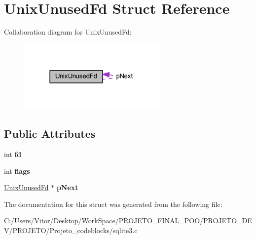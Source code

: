 \hypertarget{struct_unix_unused_fd}{\section{Unix\-Unused\-Fd Struct Reference}
\label{struct_unix_unused_fd}
}


Collaboration diagram for Unix\-Unused\-Fd\-:\nopagebreak
\begin{figure}[H]
\begin{center}
\leavevmode
\includegraphics[width=207pt]{struct_unix_unused_fd__coll__graph}
\end{center}
\end{figure}
\subsection*{Public Attributes}
\begin{DoxyCompactItemize}
\item 
\hypertarget{struct_unix_unused_fd_a3f1a6127218af971aeb7b131c9c1600d}{int {\bfseries fd}}\label{struct_unix_unused_fd_a3f1a6127218af971aeb7b131c9c1600d}

\item 
\hypertarget{struct_unix_unused_fd_a744cd118bd91ec2019108e8205708684}{int {\bfseries flags}}\label{struct_unix_unused_fd_a744cd118bd91ec2019108e8205708684}

\item 
\hypertarget{struct_unix_unused_fd_a6bbcba75beeabdd2df126638bc1d8bc0}{\hyperlink{struct_unix_unused_fd}{Unix\-Unused\-Fd} $\ast$ {\bfseries p\-Next}}\label{struct_unix_unused_fd_a6bbcba75beeabdd2df126638bc1d8bc0}

\end{DoxyCompactItemize}


The documentation for this struct was generated from the following file\-:\begin{DoxyCompactItemize}
\item 
C\-:/\-Users/\-Vitor/\-Desktop/\-Work\-Space/\-P\-R\-O\-J\-E\-T\-O\-\_\-\-F\-I\-N\-A\-L\-\_\-\-P\-O\-O/\-P\-R\-O\-J\-E\-T\-O\-\_\-\-D\-E\-V/\-P\-R\-O\-J\-E\-T\-O/\-Projeto\-\_\-codeblocks/sqlite3.\-c\end{DoxyCompactItemize}
